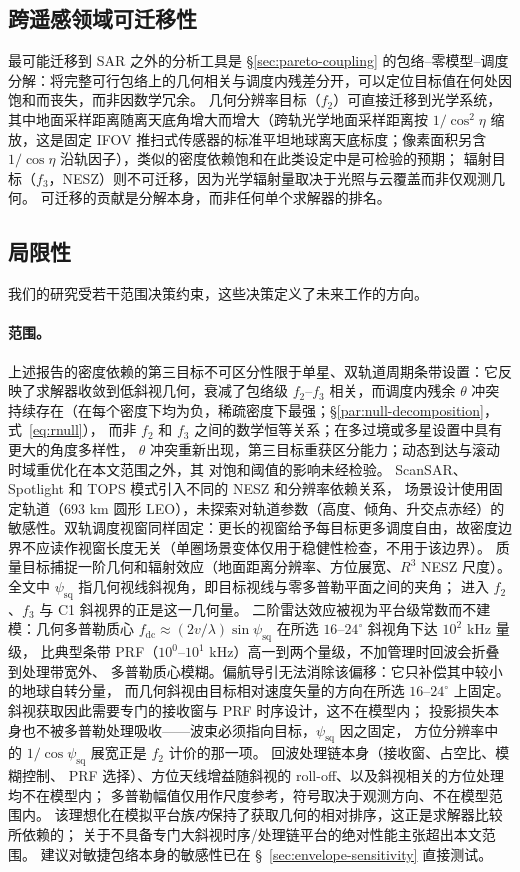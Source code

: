 \documentclass[preprint,12pt,authoryear]{elsarticle}
\begin{document}
\subsection{跨遥感领域可迁移性}
最可能迁移到 SAR 之外的分析工具是 \S\ref{sec:pareto-coupling} 的包络--零模型--调度分解：将完整可行包络上的几何相关与调度内残差分开，可以定位目标值在何处因饱和而丧失，而非因数学冗余。
几何分辨率目标（$f_2$）可直接迁移到光学系统，其中地面采样距离随离天底角增大而增大（跨轨光学地面采样距离按 $1/\cos^2\eta$ 缩放，这是固定 IFOV 推扫式传感器的标准平坦地球离天底标度；像素面积另含 $1/\cos\eta$ 沿轨因子），类似的密度依赖饱和在此类设定中是可检验的预期；
辐射目标（$f_3$，NESZ）则不可迁移，因为光学辐射量取决于光照与云覆盖而非仅观测几何。
可迁移的贡献是分解本身，而非任何单个求解器的排名。

\subsection{局限性}\label{sec:limitations}
我们的研究受若干范围决策约束，这些决策定义了未来工作的方向。

\paragraph{范围。}
上述报告的密度依赖的第三目标不可区分性限于单星、双轨道周期条带设置：它反映了求解器收敛到低斜视几何，衰减了包络级 $f_2$--$f_3$ 相关，而调度内残余 $\theta$ 冲突持续存在（在每个密度下均为负，稀疏密度下最强；\S\ref{par:null-decomposition}，式~\ref{eq:rnull}），
而非 $f_2$ 和 $f_3$ 之间的数学恒等关系；在多过境或多星设置中具有更大的角度多样性，
$\theta$ 冲突重新出现，第三目标重获区分能力；动态到达与滚动时域重优化在本文范围之外，其
对饱和阈值的影响未经检验。
ScanSAR、Spotlight 和 TOPS 模式引入不同的 NESZ 和分辨率依赖关系，
场景设计使用固定轨道（693 km 圆形 LEO），未探索对轨道参数（高度、倾角、升交点赤经）的敏感性。双轨调度视窗同样固定：更长的视窗给予每目标更多调度自由，故密度边界不应读作视窗长度无关（单圈场景变体仅用于稳健性检查，不用于该边界）。
质量目标捕捉一阶几何和辐射效应（地面距离分辨率、方位展宽、$R^3$ NESZ 尺度）。
全文中 $\psi_{\text{sq}}$ 指几何视线斜视角，即目标视线与零多普勒平面之间的夹角；
进入 $f_2$、$f_3$ 与 C1 斜视界的正是这一几何量。
二阶雷达效应被视为平台级常数而不建模：几何多普勒质心
$f_{\text{dc}} \approx (2v/\lambda)\sin\psi_{\text{sq}}$ 在所选 $16$--$24^\circ$ 斜视角下达 $10^2$ kHz 量级，
比典型条带 PRF（$10^0$--$10^1$ kHz）高一到两个量级，不加管理时回波会折叠到处理带宽外、
多普勒质心模糊。偏航导引无法消除该偏移：它只补偿其中较小的地球自转分量，
而几何斜视由目标相对速度矢量的方向在所选 $16$--$24^\circ$ 上固定。
斜视获取因此需要专门的接收窗与 PRF 时序设计，这不在模型内；
投影损失本身也不被多普勒处理吸收——波束必须指向目标，$\psi_{\text{sq}}$ 因之固定，
方位分辨率中的 $1/\cos\psi_{\text{sq}}$ 展宽正是 $f_2$ 计价的那一项。
回波处理链本身（接收窗、占空比、模糊控制、
PRF 选择）、方位天线增益随斜视的 roll-off、以及斜视相关的方位处理均不在模型内；
多普勒幅值仅用作尺度参考，符号取决于观测方向、不在模型范围内。
该理想化在模拟平台族\emph{内}保持了获取几何的相对排序，这正是求解器比较所依赖的；
关于不具备专门大斜视时序/处理链平台的绝对性能主张超出本文范围。
建议对敏捷包络本身的敏感性已在 \S~\ref{sec:envelope-sensitivity} 直接测试。
\end{document}
